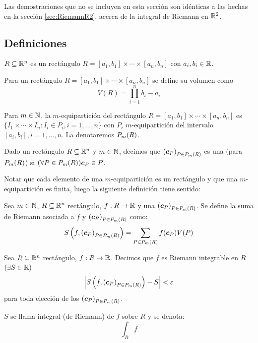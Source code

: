 Las demostraciones que no se incluyen en esta secci\'on son id\'enticas a las hechas en la secci\'on \ref{sec:RiemannR2}, acerca de la integral de Riemann en $ \mathbb{R}^2 $.

\subsection{Definiciones}

\begin{definicion}
$ R \subseteq \mathbb{R}^n $ es un rect\'angulo \tssi{} $ R = [a_1, b_1] \times \cdots \times [a_n, b_n] $ con $ a_i, b_i \in \mathbb{R} $.
\end{definicion}

\begin{definicion}
Para un rect\'angulo $ R = [a_1, b_1] \times \cdots \times [a_n, b_n] $ se define su volumen como
    \[ V(R) = \prod_{i=1}^n b_i-a_i \]
\end{definicion}

\begin{definicion}
Para $m\in \mathbb{N}$, la $m$-equipartici\'on del rect\'angulo $ R = [a_1,b_1] \times \cdots \times [a_n, b_n] $ es $ \{I_1 \times \cdots \times I_n : I_i \in P_i, i=1, \ldots, n\} $ con $ P_i $ $m$-equipartici\'on del intervalo $ [a_i, b_i] , i=1, \ldots, n $. La denotaremos $ P_{m}(R) $.
\end{definicion}

Dado un rect\'angulo $ R \subseteq \mathbb{R}^n $ y $m\in \mathbb{N}$, decimos que $ {(\boldsymbol{c}_P)}_{P \in P_{m}(R)} $ es una \familiaEleccion{} (para $ P_{m}(R)$) si $(\forall P \in P_{m}(R)) \boldsymbol{c}_P \in P $.

Notar que cada elemento de una $m$-equipartici\'on es un rect\'angulo y que una $m$-equipartici\'on es finita, luego la siguiente definici\'on tiene sentido:

\begin{definicion}
Sea $m\in \mathbb{N}$, $ R \subseteq \mathbb{R}^n $ rect\'angulo, $ f:R \to \mathbb{R}$ y una \familiaEleccion{} $ {(\boldsymbol{c}_P)}_{P \in P_{m}(R)} $. Se define la suma de Riemann  asociada a $ f $ y ${(\boldsymbol{c}_P)}_{P \in P_{m}(R)} $ como:
    \[S\left(f, {(\boldsymbol{c}_P)}_{P \in P_{m}(R)}\right) = \sum_{P \in P_{m}(R)} f(\boldsymbol{c}_P) V(P) \]
\end{definicion}

\begin{definicion}
Sea $ R \subseteq \mathbb{R}^n $ rect\'angulo, $ f:R \to \mathbb{R} $. Decimos que $f$ es Riemann integrable en $R$ \tssi{} $ (\exists S \in \mathbb{R}) $
    \[ \left\lvert S\left(f, {(\boldsymbol{c}_P)}_{P \in P_{m}(R)}\right) - S \right\rvert < \varepsilon \]
para toda elecci\'on de los $ {(\boldsymbol{c}_P)}_{P \in P_{m}(R)} $.

$S$ se llama integral (de Riemann) de $f$ sobre $R$ y se denota:
    \[ \int_R f \]
\end{definicion}

